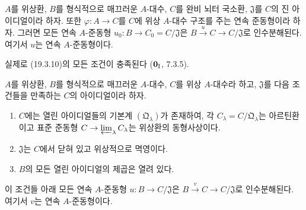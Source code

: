 \begin{corollary}[19.3.11]
\label{0.19.3.11-fr}
$A$를 위상환, $B$를 형식적으로 매끄러운 $A$-대수, $C$를 완비 뇌터
국소환, $\mathfrak J$를 $C$의 진 아이디얼이라 하자. 또한
$\varphi:A\to C$를 $C$에 위상 $A$-대수 구조를 주는 연속 준동형이라
하자. 그러면 모든 연속 $A$-준동형
$u_0:B\to C_0=C/\mathfrak J$은
$B\xrightarrow{u}C\to C/\mathfrak J$로 인수분해된다. 여기서 $u$는
연속 $A$-준동형이다.
\end{corollary}

실제로 (19.3.10)의 모든 조건이 충족된다
($\mathbf 0_{\rm I}$, 7.3.5).

\begin{proposition}[19.3.12]
\label{0.19.3.12-fr}
$A$를 위상환, $B$를 형식적으로 매끄러운 $A$-대수, $C$를 위상
$A$-대수라 하고, $\mathfrak J$를 다음 조건들을 만족하는 $C$의
아이디얼이라 하자.
\begin{enumerate}
  \item[$1^\circ$] $C$에는 열린 아이디얼들의 기본계
  $(\mathfrak Q_\lambda)$가 존재하여, 각
  $C_\lambda=C/\mathfrak Q_\lambda$는 아르틴환이고 표준 준동형
  $C\to\varprojlim_\lambda C_\lambda$는 위상환의 동형사상이다.
  \item[$2^\circ$] $\mathfrak J$는 $C$에서 닫혀 있고 위상적으로
  멱영이다.
  \item[$3^\circ$] $B$의 모든 열린 아이디얼의 제곱은 열려 있다.
\end{enumerate}
이 조건들 아래 모든 연속 $A$-준동형 $u:B\to C/\mathfrak J$은
$B\xrightarrow{v}C\to C/\mathfrak J$로 인수분해된다. 여기서 $v$는
연속 $A$-준동형이다.
\end{proposition}

